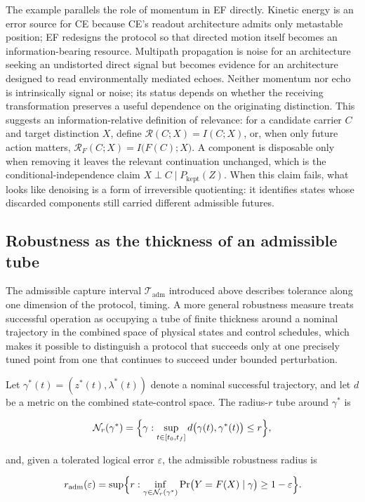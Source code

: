 \documentclass[11pt]{article}
\begin{document}
The example parallels the role of momentum in EF directly. Kinetic energy is an error source for CE because CE's readout architecture admits only metastable position; EF redesigns the protocol so that directed motion itself becomes an information-bearing resource. Multipath propagation is noise for an architecture seeking an undistorted direct signal but becomes evidence for an architecture designed to read environmentally mediated echoes. Neither momentum nor echo is intrinsically signal or noise; its status depends on whether the receiving transformation preserves a useful dependence on the originating distinction. This suggests an information-relative definition of relevance: for a candidate carrier $C$ and target distinction $X$, define $\mathcal R(C;X)=I(C;X)$, or, when only future action matters, $\mathcal R_F(C;X) = I\bigl(F(C);X\bigr)$. A component is disposable only when removing it leaves the relevant continuation unchanged, which is the conditional-independence claim $X\perp C\mid P_{\mathrm{kept}}(Z)$. When this claim fails, what looks like denoising is a form of irreversible quotienting: it identifies states whose discarded components still carried different admissible futures.

\subsection{Robustness as the thickness of an admissible tube}

The admissible capture interval $\mathcal T_{\mathrm{adm}}$ introduced above describes tolerance along one dimension of the protocol, timing. A more general robustness measure treats successful operation as occupying a tube of finite thickness around a nominal trajectory in the combined space of physical states and control schedules, which makes it possible to distinguish a protocol that succeeds only at one precisely tuned point from one that continues to succeed under bounded perturbation.

Let $\gamma^\ast(t) = (z^\ast(t),\lambda^\ast(t))$ denote a nominal successful trajectory, and let $d$ be a metric on the combined state-control space. The radius-$r$ tube around $\gamma^\ast$ is

\[
\mathcal N_r(\gamma^\ast) = \Bigl\{\gamma : \sup_{t\in[t_0,t_f]} d\bigl(\gamma(t),\gamma^\ast(t)\bigr) \le r\Bigr\},
\]

and, given a tolerated logical error $\varepsilon$, the admissible robustness radius is

\[
r_{\mathrm{adm}}(\varepsilon) = \sup\Bigl\{r : \inf_{\gamma\in\mathcal N_r(\gamma^\ast)} \Pr\bigl(Y=F(X)\mid\gamma\bigr) \ge 1-\varepsilon\Bigr\}.
\]
\end{document}
